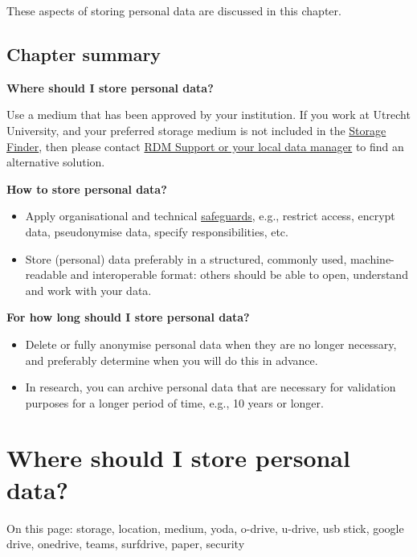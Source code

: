 \documentclass[
]{book}
\providecommand{\tightlist}{%
  \setlength{\itemsep}{0pt}\setlength{\parskip}{0pt}}
\begin{document}
These aspects of storing personal data are discussed in this chapter.

\hypertarget{chapter-summary-1}{%
\subsection{Chapter summary}\label{chapter-summary-1}}

\textbf{Where should I store personal data?}

Use a medium that has been approved by your institution. If you work at Utrecht
University, and your preferred storage medium is not included in the
\href{https://tools.uu.nl/storagefinder/}{Storage Finder},
then please contact \protect\hyperlink{support}{RDM Support or your local data manager} to find
an alternative solution.

\textbf{How to store personal data?}

\begin{itemize}
\tightlist
\item
  Apply organisational and technical \protect\hyperlink{privacy-by-design}{safeguards},
  e.g., restrict access, encrypt data, pseudonymise data, specify responsibilities, etc.
\item
  Store (personal) data preferably in a structured, commonly used, machine-readable
  and interoperable format: others should be able to open, understand and work
  with your data.
\end{itemize}

\textbf{For how long should I store personal data?}

\begin{itemize}
\tightlist
\item
  Delete or fully anonymise personal data when they are no longer necessary,
  and preferably determine when you will do this in advance.
\item
  In research, you can archive personal data that are necessary for validation
  purposes for a longer period of time, e.g., 10 years or longer.
\end{itemize}

\hypertarget{data-storage-where}{%
\section{Where should I store personal data?}\label{data-storage-where}}

On this page: storage, location, medium, yoda, o-drive, u-drive, usb stick,
google drive, onedrive, teams, surfdrive, paper, security
\end{document}

